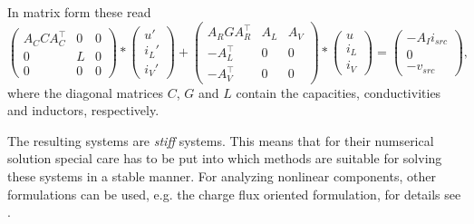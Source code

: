 In matrix form these read
\begin{equation}
	\label{MNA_Matrixform}
	\begin{pmatrix}
		A_C C A_C^\top & 0 & 0 \\
		0 & L & 0 \\
		0 & 0 & 0
	\end{pmatrix}
	*
	\begin{pmatrix}
		u' \\
		i_L' \\
		i_V'
	\end{pmatrix}
	+
	\begin{pmatrix}
		A_R G A_R^\top & A_L & A_V \\
		-A_L^\top & 0 & 0 \\
		-A_V^\top & 0 & 0 
	\end{pmatrix}
	*
	\begin{pmatrix}
		u \\
		i_L \\
		i_V
	\end{pmatrix}
	=
	\begin{pmatrix}
		-A_I i_{src} \\
		0 \\
		-v_{src}
	\end{pmatrix} , 
\end{equation}
where the diagonal matrices $C$, $G$ and $L$ contain the capacities, conductivities and inductors, respectively.

The resulting systems are \emph{stiff} systems. This means that for their numserical solution special care has to be put into which methods are suitable for solving these systems in a stable manner. For analyzing nonlinear components, other formulations can be used, e.g. the charge flux oriented formulation, for details see \cite{ModellingAndDiscretizationOfCircuitProblems}.


